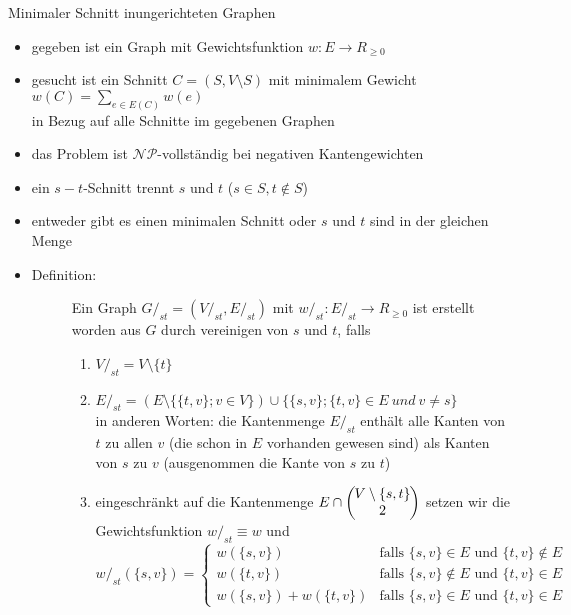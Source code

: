 \begin{TOPbreak}{Minimaler Schnitt in}{ungerichteten Graphen}
	\up\up\begin{itemize}
		\item gegeben ist ein Graph mit Gewichtsfunktion $w : E \rightarrow R_{\geq 0}$
		\item gesucht ist ein Schnitt $C=(S, V\setminus S)$ mit minimalem Gewicht $w(C)= \sum\limits_{e \in E(C)} w(e)$\\in Bezug auf alle Schnitte im gegebenen Graphen
		\item das Problem ist $\mathcal{NP}$-vollständig bei negativen Kantengewichten
		\item ein $s-t$-Schnitt trennt $s$ und $t$ ($s\in S, t \notin S$)
		\item entweder gibt es einen minimalen Schnitt oder $s$ und $t$ sind in der gleichen Menge
		\item \begin{description}
			\item[Definition:] Ein Graph $G/_{st} = (V/_{st},E/_{st})$ mit $w/_{st} : E/_{st} \rightarrow R_{\geq 0}$ ist erstellt worden aus $G$ durch vereinigen von $s$ und $t$, falls
			\begin{enumerate}
				\item $V/_{st} = V\setminus \{t\}$
				\item $E/_{st} = (E\setminus\{\{t,v\}; v \in V\}) \cup \{\{s,v\}; \{t,v\}\in E~und~v\neq s\}$\\
				in anderen Worten: die Kantenmenge $E/_{st}$ enthält alle Kanten von $t$ zu allen $v$ (die schon in $E$ vorhanden gewesen sind) als Kanten von $s$ zu $v$ (ausgenommen die Kante von $s$ zu $t$)
				\item eingeschränkt auf die Kantenmenge $E\cap \left(\hspace*{-0.2cm}\begin{array}{c}V\setminus\{s,t\}\\2\end{array}\hspace*{-0.2cm}\right)$ setzen wir die Gewichtsfunktion $w/_{st} \equiv w$ und
					\[w/_{st}(\{s,v\})= \left\{
						\begin{array}{ll}
							w(\{s,v\}) & \text{falls }\{s,v\}\in E \text{ und } \{t,v\} \notin E\\
							w(\{t,v\}) & \text{falls }\{s,v\}\notin E \text{ und } \{t,v\} \in E\\
							w(\{s,v\})+w(\{t,v\}) & \text{falls }\{s,v\}\in E \text{ und } \{t,v\} \in E
						\end{array}
\]
\end{enumerate}
\end{description}
\end{itemize}
\end{TOPbreak}
